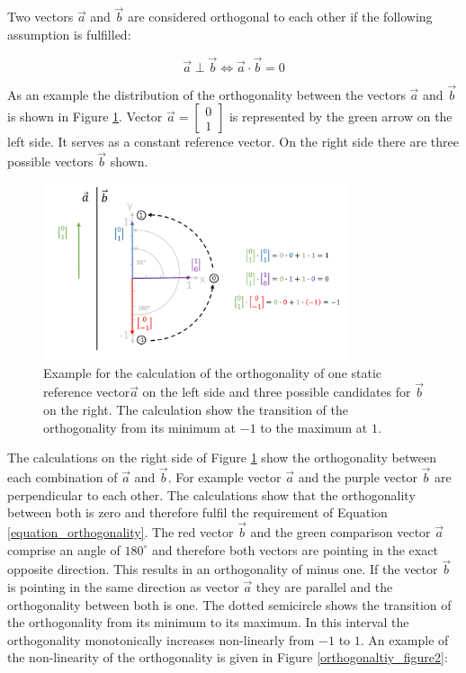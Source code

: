 Two vectors $\overrightarrow{a}$ and $\overrightarrow{b}$ are considered orthogonal to each other if the following assumption is fulfilled:

\begin{equation}
\overrightarrow{a} \perp  \overrightarrow{b} \Leftrightarrow  \overrightarrow{a} \cdot  \overrightarrow{b} = 0
\label{equation_orthogonality}
\end{equation}


As an example the distribution of the orthogonality between the vectors $\overrightarrow{a}$ and $\overrightarrow{b}$  is shown in Figure \ref{orthogonaltiy_figure}. Vector $\overrightarrow{a} = \begin{bmatrix} 0 \\ 1 \end{bmatrix}$ is represented by the green arrow on the left side. It serves as a constant reference vector. On the right side there are three possible vectors $\overrightarrow{b}$ shown.

\begin{figure}[H]
    \centering
    \includegraphics[width=0.8\textwidth]{Graphics/orthogonality.png}
    \caption{Example for the calculation of the orthogonality of one static reference vector$\overrightarrow{a}$ on the left side and three possible candidates for $\overrightarrow{b}$ on the right. The calculation show the transition of the orthogonality from its minimum at $-1$ to the maximum at $1$.}
    \label{orthogonaltiy_figure}
\end{figure}

The calculations on the right side of Figure \ref{orthogonaltiy_figure} show the orthogonality between each combination of $\overrightarrow{a}$ and $\overrightarrow{b}$. For example vector $\overrightarrow{a}$ and the purple vector $\overrightarrow{b}$ are perpendicular to each other. The calculations show that the orthogonality between both is zero and therefore fulfil the requirement of Equation \ref{equation_orthogonality}. The red vector $\overrightarrow{b}$ and the green comparison vector $\overrightarrow{a}$ comprise an angle of $180^{\circ}$ and therefore both vectors are pointing in the exact opposite direction. This results in an orthogonality of minus one.
If the vector $\overrightarrow{b}$ is pointing in the same direction as vector $\overrightarrow{a}$ they are parallel and the orthogonality between both is one. The dotted semicircle shows the transition of the orthogonality from its minimum to its maximum. In this interval the orthogonality monotonically increases non-linearly from $-1$ to $1$. An example of the non-linearity of the orthogonality is given in Figure \ref{orthogonaltiy_figure2}:

